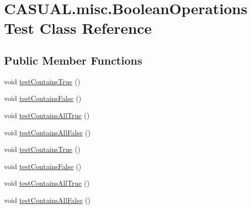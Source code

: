 \hypertarget{class_c_a_s_u_a_l_1_1misc_1_1_boolean_operations_test}{\section{C\-A\-S\-U\-A\-L.\-misc.\-Boolean\-Operations\-Test Class Reference}
\label{class_c_a_s_u_a_l_1_1misc_1_1_boolean_operations_test}
}
\subsection*{Public Member Functions}
\begin{DoxyCompactItemize}
\item 
void \hyperlink{class_c_a_s_u_a_l_1_1misc_1_1_boolean_operations_test_ab62a6047a5c210880852ab1241b637a7}{test\-Contains\-True} ()
\item 
void \hyperlink{class_c_a_s_u_a_l_1_1misc_1_1_boolean_operations_test_a0936c1a0199de2400fed118197dbd1f8}{test\-Contains\-False} ()
\item 
void \hyperlink{class_c_a_s_u_a_l_1_1misc_1_1_boolean_operations_test_a234d417b52c7f84043bd6cf206ecf781}{test\-Contains\-All\-True} ()
\item 
void \hyperlink{class_c_a_s_u_a_l_1_1misc_1_1_boolean_operations_test_a75317ddd000f48b8025c2b6c08b5b87e}{test\-Contains\-All\-False} ()
\item 
void \hyperlink{class_c_a_s_u_a_l_1_1misc_1_1_boolean_operations_test_ab62a6047a5c210880852ab1241b637a7}{test\-Contains\-True} ()
\item 
void \hyperlink{class_c_a_s_u_a_l_1_1misc_1_1_boolean_operations_test_a0936c1a0199de2400fed118197dbd1f8}{test\-Contains\-False} ()
\item 
void \hyperlink{class_c_a_s_u_a_l_1_1misc_1_1_boolean_operations_test_a234d417b52c7f84043bd6cf206ecf781}{test\-Contains\-All\-True} ()
\item 
void \hyperlink{class_c_a_s_u_a_l_1_1misc_1_1_boolean_operations_test_a75317ddd000f48b8025c2b6c08b5b87e}{test\-Contains\-All\-False} ()
\end{DoxyCompactItemize}
